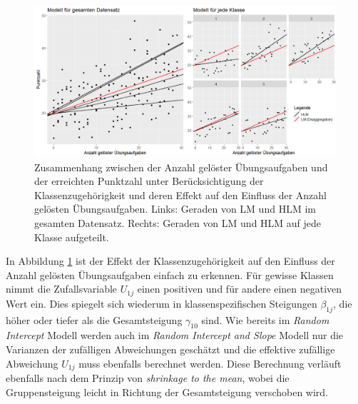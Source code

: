 \documentclass[12pt]{article}\usepackage[]{graphicx}\usepackage[]{color}
\begin{document}
\begin{figure}[t!]
\centering
\includegraphics[width = \textwidth]{./figures/random_intercept_slope}
\caption{Zusammenhang zwischen der Anzahl gelöster Übungsaufgaben und der erreichten Punktzahl unter Berücksichtigung der Klassenzugehörigkeit und deren Effekt auf den Einfluss der Anzahl gelösten Übungsaufgaben. Links: Geraden von LM und HLM im gesamten Datensatz. Rechts: Geraden von LM und HLM auf jede Klasse aufgeteilt.}
\label{fig:random_intercept_slope}
\end{figure}

In Abbildung \ref{fig:random_intercept_slope} ist der Effekt der Klassenzugehörigkeit auf den Einfluss der Anzahl gelösten Übungsaufgaben einfach zu erkennen. Für gewisse Klassen nimmt die Zufallsvariable $U_{1j}$ einen positiven und für andere einen negativen Wert ein. Dies spiegelt sich wiederum in klassenspezifischen Steigungen $\beta_{1j}$, die höher oder tiefer als die Gesamtsteigung $\gamma_{10}$ sind. Wie bereits im \textit{Random Intercept} Modell werden auch im \textit{Random Intercept and Slope} Modell nur die Varianzen der zufälligen Abweichungen geschätzt und die effektive zufällige Abweichung $U_{1j}$ muss ebenfalls berechnet werden. Diese Berechnung verläuft ebenfalls nach dem Prinzip von \textit{shrinkage to the mean}, wobei die Gruppensteigung leicht in Richtung der Gesamtsteigung verschoben wird.
\end{document}
